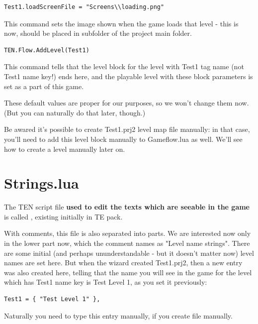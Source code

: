 \begin{lstlisting}[style=lua]
Test1.loadScreenFile = "Screens\\loading.png"
\end{lstlisting}

This command sets the image shown when the game loads that level - this is  now, should be placed in  subfolder of the project main folder.

\begin{lstlisting}[style=lua]
TEN.Flow.AddLevel(Test1)
\end{lstlisting}

This command tells that the level block for the level with Test1 tag name (not Test1 name key!) ends here, and the playable level with these block parameters is set as a part of this game.
\\
\par These default values are proper for our purposes, so we won't change them now. (But you can naturally do that later, though.)

Be awared it's possible to create Test1.prj2 level map file manually: in that case, you'll need to add this level block manually to Gameflow.lua as well. We'll see how to create a level manually later on. %

\section{Strings.lua}

The TEN script file \textbf{used to edit the texts which are seeable in the game} is called , existing initially in TE pack.

\par With comments, this file is also separated into parts. We are interested now only in the lower part now, which the comment names as "Level name strings".
There are some initial (and perhaps ununderstandable - but it doesn't matter now) level names are set here. But when the wizard created Test1.prj2, then a new entry was also created here, telling that the name you will see in the game for the level which has Test1 name key is Test Level 1, as you set it previously:

\begin{lstlisting}[style=lua]
Test1 = { "Test Level 1" },
\end{lstlisting}

Naturally you need to type this entry manually, if you create  file manually.

